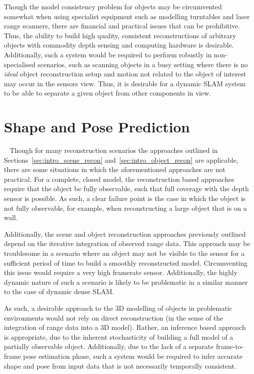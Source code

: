 Though the model consistency problem for objects may be circumvented somewhat when using specialist equipment 
such as modelling turntables and laser range scanners, there are financial and practical issues that can be 
prohibitive. Thus, the ability to build high quality, consistent reconstructions of arbitrary objects with 
commodity depth sensing and computing hardware is desirable. Additionally, such a system would be required to 
perform robustly in non-specialised scenarios, such as scanning objects in a busy setting where there is no 
\textit{ideal} object reconstruction setup and motion not related to the object of interest may occur in the 
sensors view. Thus, it is desirable for a dynamic SLAM system to be able to separate a given object from other 
components in view.

\section{Shape and Pose Prediction}
~\label{sec:intro_spp}
Though for many reconstruction scenarios the approaches outlined in Sections~\ref{sec:intro_scene_recon} 
and~\ref{sec:intro_object_recon} are applicable, there are some situations in which the aforementioned 
approaches are not practical. For a complete, closed model, the reconstruction based approaches require that 
the object be fully observable, such that full coverage with the depth sensor is possible. As such, a clear 
failure point is the case in which the object is not fully observable, for example, when reconstructing a large 
object that is on a wall.

Additionally, the scene and object reconstruction approaches previously outlined depend on the iterative 
integration of observed range data. This approach may be troublesome in a scenario where an object may not 
be visible to the sensor for a sufficient period of time to build a smoothly reconstructed model. Circumventing 
this issue would require a very high framerate sensor. Additionally, the highly dynamic nature of such a scenario 
is likely to be problematic in a similar manner to the case of dynamic dense SLAM\@.

As such, a desirable approach to the 3D modelling of objects in problematic environments would not rely on 
direct reconstruction (in the sense of the integration of range data into a 3D model). Rather, an inference based 
approach is appropriate, due to the inherent stochasticity of building a full model of a partially observable 
object. Additionally, due to the lack of a separate frame-to-frame pose estimation phase, such a system would 
be required to infer accurate shape and pose from input data that is not necessarily temporally consistent.

